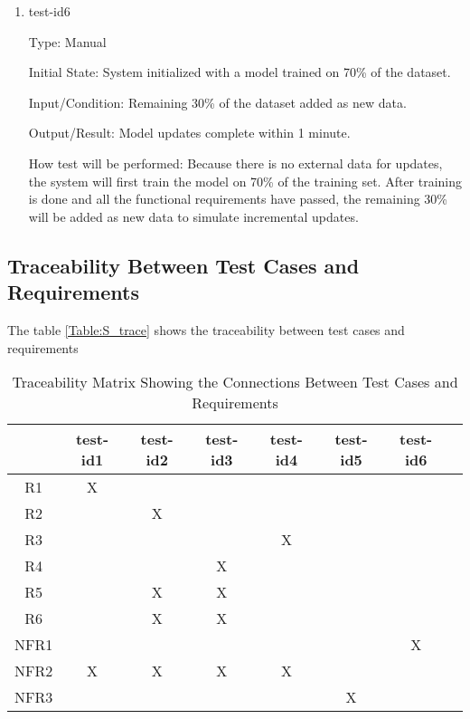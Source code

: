 \documentclass[12pt, titlepage]{article}
\begin{document}
\begin{enumerate}

\item{test-id6\\}

Type: Manual

Initial State: System initialized with a model trained on 70\% of the dataset.

Input/Condition: Remaining 30\% of the dataset added as new data.

Output/Result: Model updates complete within 1 minute.

How test will be performed: Because there is no external data for updates, the system will first train the model on 70\% of the training set. After training is done and all the functional requirements have passed, the remaining 30\% will be added as new data to simulate incremental updates.


\end{enumerate}

\subsection{Traceability Between Test Cases and Requirements}

The table \ref{Table:S_trace}
 shows the traceability between test cases and requirements

\begin{table}[h!]\label{Table:S_trace}
  \centering
  \begin{tabular}{|c|c|c|c|c|c|c|c|}
  \hline
    & test-id1& test-id2& test-id3&test-id4&test-id5&test-id6 \\
  \hline
  R1        & X&  & & & & \\ \hline
  R2        & & X& & & & \\ \hline
  R3        & & & &X& &\\ \hline
  R4        & & & X& & &\\ \hline
  R5        & &X & X& & &\\ \hline
  R6        & &X & X& & &\\ \hline
  NFR1      & & & & & &X\\ \hline
  NFR2      &X & X& X& X& &\\ \hline
  NFR3      & & & & &X&\\ \hline
  \end{tabular}
  \caption{Traceability Matrix Showing the Connections Between Test Cases and Requirements}
  \label{Table:A_trace}
  \end{table}
\end{document}
